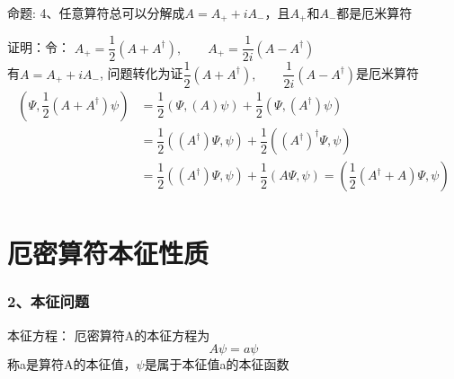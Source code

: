 \begin{frame} [allowframebreaks=]
    \frametitle{}
    \begin{tcolorbox1}{命题:}
       4、任意算符总可以分解成$A=A_+ +iA_-$，且$A_+$和$A_-$都是厄米算符
    \end{tcolorbox1}
    \alert{证明：}令：
    $A_+=\dfrac{1}{2} (A+A^\dagger), \qquad A_+=\dfrac{1}{2i} (A-A^\dagger) $\\
    有$A=A_+ +iA_-$, 问题转化为证$\dfrac{1}{2} (A+A^\dagger), \qquad \dfrac{1}{2i} (A-A^\dagger) $是厄米算符\\
    \begin{equation*}
        \begin{split}
            (\Psi, \dfrac{1}{2} (A+A^\dagger)\psi ) &=\dfrac{1}{2}(\Psi, (A)\psi) + \dfrac{1}{2}(\Psi, (A^\dagger)\psi) \\
            &= \dfrac{1}{2}((A^\dagger)\Psi, \psi) + \dfrac{1}{2}((A^\dagger)^\dagger\Psi, \psi) \\
            &= \dfrac{1}{2}((A^\dagger)\Psi, \psi) + \dfrac{1}{2}(A\Psi, \psi)= ( \dfrac{1}{2}(A^\dagger + A) \Psi, \psi ) \\
         \end{split}
    \end{equation*}  
\end{frame} 

\section{厄密算符本征性质}

\begin{frame}
    \frametitle{2、本征问题}
    \begin{tcolorbox1}{本征方程：}
        厄密算符A的本征方程为
        $$ A\psi=a \psi $$
        称a是算符A的本征值，$\psi$是属于本征值a的本征函数
     \end{tcolorbox1}   
\end{frame} 

